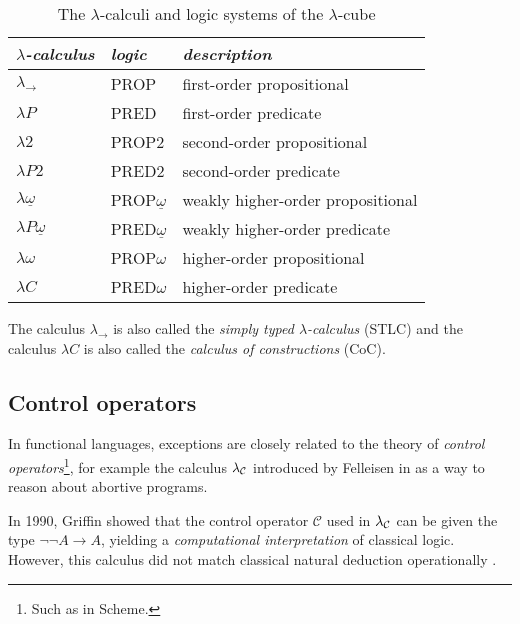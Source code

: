 \begin{table}
\centering
\begin{tabular}{lll}
\toprule
\textit{$\lambda$-calculus} & \textit{logic} & \textit{description} \\
\midrule
$\lambda_\to$ & PROP & first-order propositional \\
$\lambda{}P$ & PRED & first-order predicate \\
$\lambda{}2$ & PROP2 & second-order propositional \\
$\lambda{}P2$ & PRED2 & second-order predicate \\
$\lambda\underline{\omega}$ & PROP$\underline{\omega}$ & weakly higher-order propositional \\
$\lambda{}P\underline{\omega}$& PRED$\underline{\omega}$ & weakly higher-order predicate \\
$\lambda\omega$ & PROP$\omega$ & higher-order propositional \\
$\lambda{}C$ & PRED$\omega$ & higher-order predicate \\
\bottomrule
\end{tabular}

\vspace{8pt}
{\small The calculus $\lambda_\to$ is also called the \emph{simply typed $\lambda$-calculus} (STLC)
and the calculus $\lambda{}C$ is also called the \emph{calculus of constructions} (CoC).}
\caption{The $\lambda$-calculi and logic systems of the $\lambda$-cube \cite{barendregt91}}
\label{tab:lambda-cube}
\end{table}

\subsection{Control operators}

In functional languages, exceptions are closely related to the theory of
\emph{control operators}\footnote{Such as  in Scheme.},
for example the calculus $\lambda_\mathcal{C}$ introduced by Felleisen in \cite{felleisen87}
as a way to reason about abortive programs.


In 1990, Griffin showed \cite{griffin90} that the control operator $\mathcal{C}$
used in $\lambda_\mathcal{C}$ can be given the type $\neg \neg A \to A$, yielding a \emph{computational
interpretation} of classical logic. However, this calculus did not match
classical natural deduction operationally \cite{ariola-herbelin}.

